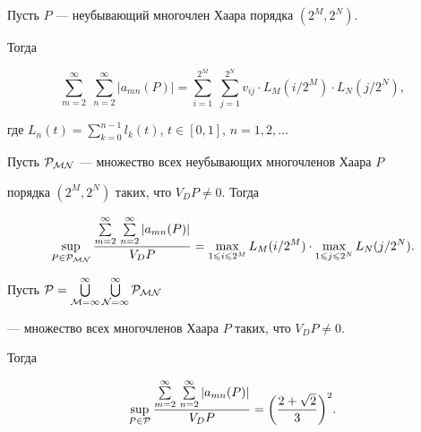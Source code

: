 \begin{lem}


Пусть $P$ --- неубывающий многочлен Хаара порядка $(2^M, 2^N)$.


Тогда


$$


\sum\limits_{m=2}^{\infty}\; \sum\limits_{n=2}^{\infty} |a_{mn}(P)| =


\sum\limits_{i=1}^{2^M}\; \sum\limits_{j=1}^{2^N}


v_{ij}\cdot L_M(i/2^M)\cdot L_N(j/2^N),


$$


где $L_n(t)=\sum\limits_{k=0}^{n-1} l_k(t)$, $t\in[0,1]$, $n=1,2,\dotsc$


\end{lem}





\begin{lem}


Пусть $\cal P_{MN}$ --- множество всех неубывающих многочленов Хаара $P$


порядка $(2^M, 2^N)$ таких, что $V_D P \neq 0$. Тогда


$$


\sup\limits_{P\in\cal P_{MN}}


\frac{\sum\limits_{m=2}^{\infty}\, \sum\limits_{n=2}^{\infty}


|a_{mn}(P)|}{V_D P} =


\max\limits_{1\leqslant i\leqslant 2^M} L_M(i/2^M) \cdot


\max\limits_{1\leqslant j\leqslant 2^N} L_N(j/2^N).


$$


\end{lem}





\begin{lem}


Пусть $\cal P=\bigcup\limits_{M=1}^{\infty}


\bigcup\limits_{N=1}^{\infty} \cal P_{MN}$


--- множество всех многочленов Хаара $P$ таких, что $V_D P \neq 0$.


Тогда


$$


\sup\limits_{P\in\cal P}


\frac{\sum\limits_{m=2}^{\infty}\,\sum\limits_{n=2}^{\infty}


|a_{mn}(P)| }{V_D P} =


\bigg(\dfrac{2+\sqrt{2}}{3}\bigg)^2.


$$


\end{lem}





